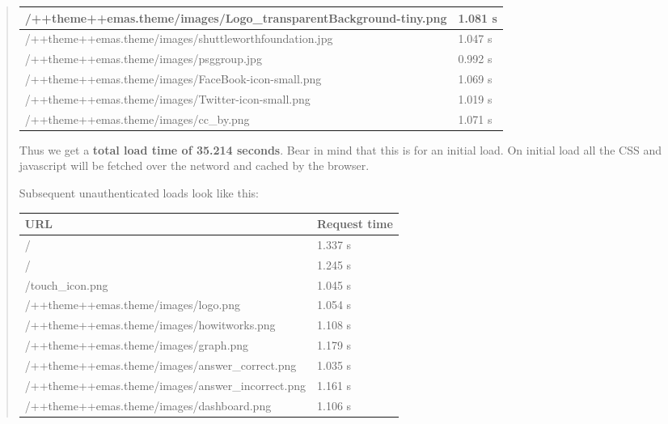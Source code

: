 \documentclass[letterpaper,10pt,english]{sphinxmanual}
\begin{document}
\begin{quote}
\begin{longtable}{|l|l|}
/++theme++emas.theme/images/Logo\_transparentBackground-tiny.png
 & 
1.081 s
\\\hline

/++theme++emas.theme/images/shuttleworthfoundation.jpg
 & 
1.047 s
\\\hline

/++theme++emas.theme/images/psggroup.jpg
 & 
0.992 s
\\\hline

/++theme++emas.theme/images/FaceBook-icon-small.png
 & 
1.069 s
\\\hline

/++theme++emas.theme/images/Twitter-icon-small.png
 & 
1.019 s
\\\hline

/++theme++emas.theme/images/cc\_by.png
 & 
1.071 s
\\\hline
\end{longtable}


Thus we get a \textbf{total load time of 35.214 seconds}.  Bear in mind that this
is for an initial load.  On initial load all the CSS and javascript will be
fetched over the netword and cached by the browser.

Subsequent unauthenticated loads look like this:

\begin{tabulary}{\linewidth}{|L|L|}
\hline
\textbf{\relax 
URL
} & \textbf{\relax 
Request time
}\\\hline

/
 & 
1.337 s
\\\hline

/
 & 
1.245 s
\\\hline

/touch\_icon.png
 & 
1.045 s
\\\hline

/++theme++emas.theme/images/logo.png
 & 
1.054 s
\\\hline

/++theme++emas.theme/images/howitworks.png
 & 
1.108 s
\\\hline

/++theme++emas.theme/images/graph.png
 & 
1.179 s
\\\hline

/++theme++emas.theme/images/answer\_correct.png
 & 
1.035 s
\\\hline

/++theme++emas.theme/images/answer\_incorrect.png
 & 
1.161 s
\\\hline

/++theme++emas.theme/images/dashboard.png
 & 
1.106 s
\\\hline


\end{tabulary}
\end{quote}
\end{document}
